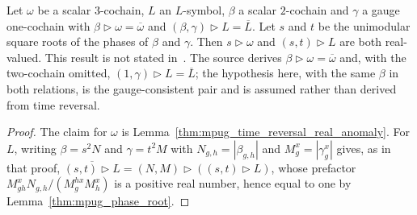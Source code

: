 \begin{lemma}
    \label{thm:mpug_time_reversal_real_l_symbols}
    \leanok
    Let $\omega$ be a scalar $3$-cochain, $L$ an $L$-symbol, $\beta$ a
    scalar $2$-cochain and $\gamma$ a gauge one-cochain with
    $\beta\mathbin{\triangleright}\omega=\overline\omega$ and
    $(\beta,\gamma)\mathbin{\triangleright}L=\overline L$. Let $s$ and $t$ be
    the unimodular square roots of the phases of $\beta$ and $\gamma$. Then
    $s\mathbin{\triangleright}\omega$ and
    $(s,t)\mathbin{\triangleright}L$ are both real-valued. This result is not stated
    in~\cite[Section~4.3]{GarreRubio2023MPOSym}.
    The source derives $\beta\mathbin{\triangleright}\omega=\overline\omega$
    and, with the two-cochain omitted,
    $(1,\gamma)\mathbin{\triangleright}L=\overline L$; the hypothesis here,
    with the same $\beta$ in both relations, is the gauge-consistent pair
    and is assumed rather than derived from time reversal.
\end{lemma}
\begin{proof}\leanok
    The claim for $\omega$ is Lemma~\ref{thm:mpug_time_reversal_real_anomaly}.
    For $L$, writing $\beta=s^2N$ and $\gamma=t^2M$ with
    $N_{g,h}=|\beta_{g,h}|$ and $M^x_g=|\gamma^x_g|$ gives, as in that proof,
    $\overline{(s,t)\mathbin{\triangleright}L}
        =(N,M)\mathbin{\triangleright}((s,t)\mathbin{\triangleright}L)$, whose
    prefactor
    $M^x_{gh}N_{g,h}/(M^{h x}_gM^x_h)$ is a positive real number, hence
    equal to one by Lemma~\ref{thm:mpug_phase_root}.
\end{proof}


